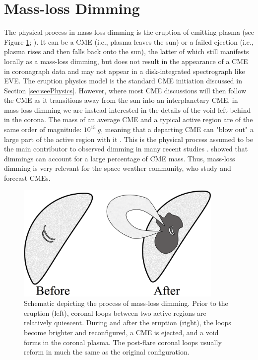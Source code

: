 \section{Mass-loss Dimming}
The physical process in mass-loss dimming is the eruption of emitting plasma (see Figure \ref{massLossDimming}; \citealt{Harrison2000, Harra2001}). It can be a CME (i.e., plasma leaves the sun) or a failed ejection (i.e., plasma rises and then falls back onto the sun), the latter of which still manifests locally as a mass-loss dimming, but does not result in the appearance of a CME in coronagraph data and may not appear in a disk-integrated spectrograph like EVE. The eruption physics model is the standard CME initiation discussed in Section \ref{sec:seePhysics}. However, where most CME discussions will then follow the CME as it transitions away from the sun into an interplanetary CME, in mass-loss dimming we are instead interested in the details of the void left behind in the corona. The mass of an average CME and a typical active region are of the same order of magnitude: $10^{15}\ g$, meaning that a departing CME can "blow out" a large part of the active region with it \citep{Aschwanden2009}. This is the physical process assumed to be the main contributor to observed dimming in many recent studies \citep{Sterling1997, Reinard2008, Reinard2009, Aschwanden2009}. \citet{Harrison2003} showed that dimmings can account for a large percentage of CME mass. Thus, mass-loss dimming is very relevant for the space weather community, who study and forecast CMEs.

\begin{figure}[!b]
    \begin{center}
	    \includegraphics[width=100mm]{Images/MassLossDimming.png}
    \end{center}
    \caption[Schematic of mass-loss dimming]{
	    Schematic depicting the process of mass-loss dimming. Prior to the eruption (left), coronal loops between two 
	    active regions are relatively quiescent. During and after the eruption (right), the loops become brighter and 
	    reconfigured, a CME is ejected, and a void forms in the coronal plasma. The post-flare coronal loops usually 
	    reform in much the same as the original configuration. 
	}
    \label{massLossDimming}
\end{figure}

